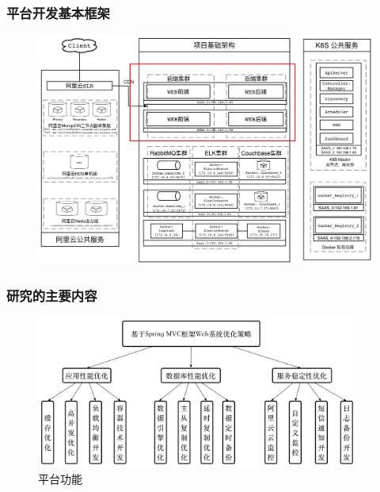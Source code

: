 \documentclass{beamer}
\begin{document}
\begin{frame}
  \frametitle{平台开发基本框架}
  \begin{figure}
  \centering
    \includegraphics[width=\textwidth]{./img/02/deploy.png}
    \label{fig:deploy}
  \end{figure}
\end{frame}

\begin{frame}
  \frametitle{研究的主要内容}
  \begin{figure}
  \centering
    \includegraphics[height=5cm]{./img/02/summery.png}
    \caption{平台功能}
    \label{fig:summery}
  \end{figure}
\end{frame}
\end{document}
